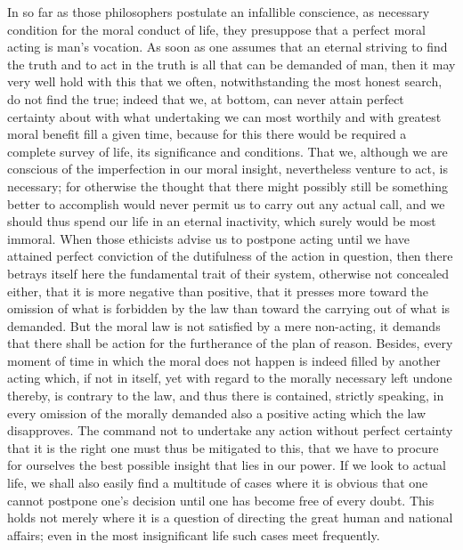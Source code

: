\documentclass[12pt,a4paper,openany]{book}
\newcommand{\opage}[1]{\marginnote{\footnotesize\textit{[#1]}}}
\begin{document}
In so far as those philosophers postulate an infallible conscience, as necessary
condition for the moral conduct of life, they presuppose that a perfect moral acting
is man's vocation. As soon as one assumes that an eternal striving to find the truth
and to act in the truth is all that can be demanded of man, then it may very well
hold with this that we often, notwithstanding the most honest search, do not find the
true; indeed that we, at bottom, can never attain perfect certainty about with what
undertaking we can most worthily and with greatest moral benefit fill a given time,
because for this there would be required a complete survey of life, its significance
and conditions. That we, although we are conscious of the imperfection in our moral
insight, nevertheless venture to act, is necessary; for otherwise the thought that
there might possibly still be something better to accomplish would never permit us to
carry out any actual call, and we should thus spend our life in an eternal
inactivity, which surely
\setcounter{footnote}{0}%
\opage{94}would be most immoral. When those ethicists advise us to postpone acting until we
have attained perfect conviction of the dutifulness of the action in question, then
there betrays itself here the fundamental trait of their system, otherwise not
concealed either, that it is more negative than positive, that it presses more toward
the omission of what is forbidden by the law than toward the carrying out of what is
demanded. But the moral law is not satisfied by a mere non-acting, it demands that
there shall be action for the furtherance of the plan of reason. Besides, every
moment of time in which the moral does not happen is indeed filled by another acting
which, if not in itself, yet with regard to the morally necessary left undone
thereby, is contrary to the law, and thus there is contained, strictly speaking, in
every omission of the morally demanded also a positive acting which the law
disapproves. The command not to undertake any action without perfect certainty that
it is the right one must thus be mitigated to this, that we have to procure for
ourselves the best possible insight that lies in our power. If we look to actual
life, we shall also easily find a multitude of cases where it is obvious that one
cannot postpone one's decision until one has become free of every doubt. This holds
not merely where it is a question of directing the great human and national affairs;
even in the most insignificant life such cases meet frequently.
\end{document}
